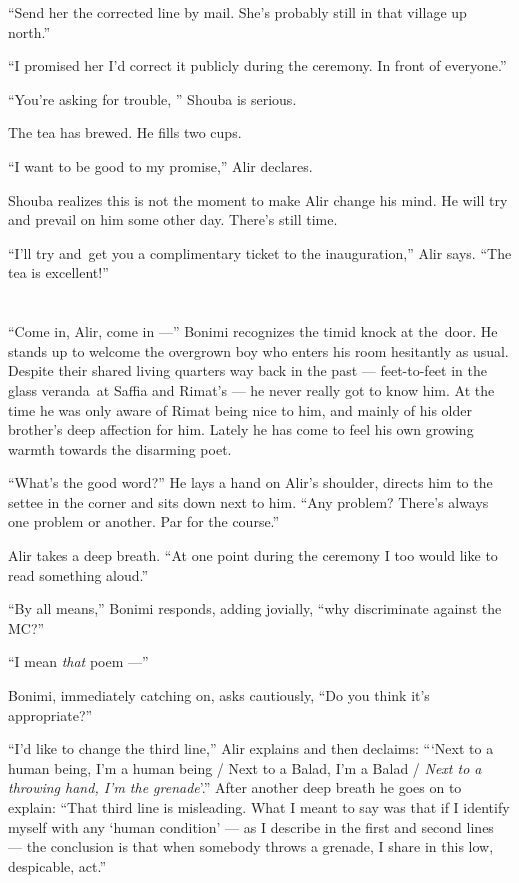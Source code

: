 \documentclass[twoside,11pt,openany]{book}
\begin{document}
``Send her the corrected line by mail. She's probably still in that village up north.''

``I promised her I'd correct it publicly during the ceremony. In front of everyone.''

``You're asking for trouble, '' Shouba is serious.

The tea has brewed. He fills two cups.

``I want to be good to my promise,'' Alir declares.

Shouba realizes this is not the moment to make Alir change his mind. He will try and prevail on him some other day.
There's still time.

``I'll try and~get you a complimentary ticket to the inauguration,'' Alir says.
``The tea is excellent!''



\chapter{}

``Come in, Alir, come in ---'' Bonimi recognizes the timid knock at the~door. He stands up to
welcome the overgrown boy who enters his room hesitantly as usual. Despite their shared living quarters way back in
the past --- feet-to-feet in the glass veranda~at Saffia and Rimat's --- he never really got to
know him. At the time he was only aware of Rimat being nice to him, and mainly of his older brother's deep affection
for him. Lately he has come to feel his own growing warmth towards the disarming poet.

``What's the good word?'' He lays a hand on Alir's shoulder, directs him to the settee in the
corner and sits down next to him. ``Any problem? There's always one problem or another. Par for the
course.''

Alir takes a deep breath. ``At one point during the ceremony I too would like to read something
aloud.''

``By all means,'' Bonimi responds, adding jovially,
``why discriminate against the MC?''

``I mean \textit{that} poem ---''

Bonimi, immediately catching on, asks cautiously, ``Do you think it's appropriate?''

``I'd like to change the third line,'' Alir explains and then declaims: ``{\thinspace}`Next
to a human being, I'm a human being / Next to a Balad, I'm a Balad / \textit{Next to a throwing hand, I'm the
grenade}'.'' After another deep breath he goes on to explain: ``That third line is
misleading. What I meant to say was that if I identify myself with any `human condition' --- as I describe in the first
and second lines --- the conclusion is that when somebody throws a grenade, I share in this low, despicable, act.''
\end{document}

